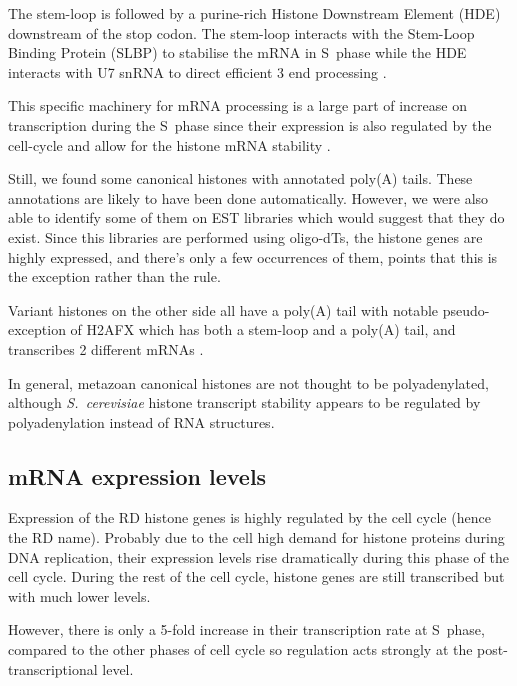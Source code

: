 \documentclass[10pt,a4paper,onecolumn,article]{memoir}
\newcommand{\addref}[1][]{\todo[color=red!40,size=\tiny]{Add reference: #1}}
\begin{document}

      The stem-loop is followed by a purine-rich Histone Downstream Element (HDE)
      downstream of the stop codon. The stem-loop interacts with the Stem-Loop
      Binding Protein (SLBP) to stabilise the mRNA in S~phase \citep{SLBP-regulation}
      while the HDE interacts with U7 snRNA to direct efficient 3 end processing
      \citep{HDE-sequence}.


      This specific machinery for mRNA processing is a large part of increase on
      transcription during the S~phase since their expression is also regulated
      by the cell-cycle \addref and allow for the histone mRNA stability \addref.

      Still, we found some canonical histones with annotated poly(A) tails. These annotations
      are likely to have been done automatically. However, we were also able to identify
      some of them on EST libraries which would suggest that they do exist. Since
      this libraries are performed using oligo-dTs, the histone genes are highly
      expressed, and there's only a few occurrences of them, points that this is
      the exception rather than the rule.

      Variant histones on the other side all have a poly(A) tail with notable
      pseudo-exception of H2AFX which has both a stem-loop and a poly(A) tail,
      and transcribes 2 different mRNAs \citep{HTwoAX-transcripts}.

      In general, metazoan canonical histones
      are not thought to be polyadenylated, although \textit{S.\ cerevisiae} histone transcript stability
      appears to be regulated by polyadenylation instead of RNA structures.

    \subsection{mRNA expression levels}
      Expression of the RD histone genes is highly regulated by the cell cycle (hence the RD name). Probably due
      to the cell high demand for histone proteins during DNA replication, their expression levels rise dramatically
      during this phase of the cell cycle. During the rest of the cell cycle, histone genes are still transcribed
      but with much lower levels.

      However, there is only a 5-fold increase in their transcription rate at S~phase, compared to the other phases
      of cell cycle so regulation acts strongly at the post-transcriptional level\addref.
\end{document}
